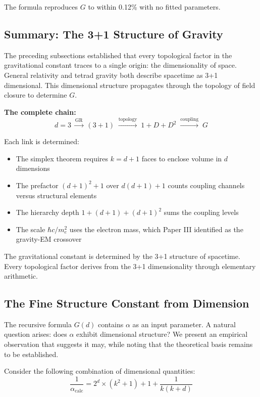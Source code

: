 \documentclass[aps,prd,preprint,superscriptaddress,showpacs,preprintnumbers,amsmath,amssymb,nofootinbib]{revtex4-2}
\begin{document}
The formula reproduces $G$ to within 0.12\% with no fitted parameters.

\subsection{Summary: The 3+1 Structure of Gravity}
\label{subsec:g-dimensional}

The preceding subsections established that every topological factor in the gravitational constant traces to a single origin: the dimensionality of space. General relativity and tetrad gravity both describe spacetime as 3+1 dimensional. This dimensional structure propagates through the topology of field closure to determine $G$.

\textbf{The complete chain:}
\begin{equation}
d = 3 \;\xrightarrow{\text{GR}}\; (3+1) \;\xrightarrow{\text{topology}}\; 1 + D + D^2 \;\xrightarrow{\text{coupling}}\; G
\end{equation}

Each link is determined:
\begin{itemize}
\item The simplex theorem requires $k = d+1$ faces to enclose volume in $d$ dimensions
\item The prefactor $(d+1)^2 + 1$ over $d(d+1) + 1$ counts coupling channels versus structural elements
\item The hierarchy depth $1 + (d+1) + (d+1)^2$ sums the coupling levels
\item The scale $\hbar c/m_e^2$ uses the electron mass, which Paper III identified as the gravity-EM crossover
\end{itemize}

The gravitational constant is determined by the 3+1 structure of spacetime. Every topological factor derives from the 3+1 dimensionality through elementary arithmetic.

\subsection{The Fine Structure Constant from Dimension}
\label{subsec:g-alpha}

The recursive formula $G(d)$ contains $\alpha$ as an input parameter. A natural question arises: does $\alpha$ exhibit dimensional structure? We present an empirical observation that suggests it may, while noting that the theoretical basis remains to be established.

Consider the following combination of dimensional quantities:
\begin{equation}
\frac{1}{\alpha_{\text{calc}}} = 2^d \times (k^2 + 1) + 1 + \frac{1}{k(k + d)}
\end{equation}
\end{document}
